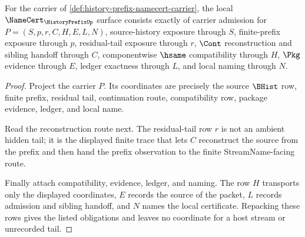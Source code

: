 \begin{theorem}
\label{thm:history-prefix-namecert-obligations}
For the carrier of \autoref{def:history-prefix-namecert-carrier}, the local $\NameCert_{\HistoryPrefixUp}$ surface consists exactly of carrier admission for $P=(S,p,r,C,H,E,L,N)$, source-history exposure through $S$, finite-prefix exposure through $p$, residual-tail exposure through $r$, $\Cont$ reconstruction and sibling handoff through $C$, componentwise $\hsame$ compatibility through $H$, $\Pkg$ evidence through $E$, ledger exactness through $L$, and local naming through $N$.
\end{theorem}
\begin{proof}
Project the carrier $P$. Its coordinates are precisely the source $\BHist$ row, finite prefix, residual tail, continuation route, compatibility row, package evidence, ledger, and local name.

Read the reconstruction route next. The residual-tail row $r$ is not an ambient hidden tail; it is the displayed finite trace that lets $C$ reconstruct the source from the prefix and then hand the prefix observation to the finite StreamName-facing route.

Finally attach compatibility, evidence, ledger, and naming. The row $H$ transports only the displayed coordinates, $E$ records the source of the packet, $L$ records admission and sibling handoff, and $N$ names the local certificate. Repacking these rows gives the listed obligations and leaves no coordinate for a host stream or unrecorded tail.
\end{proof}

